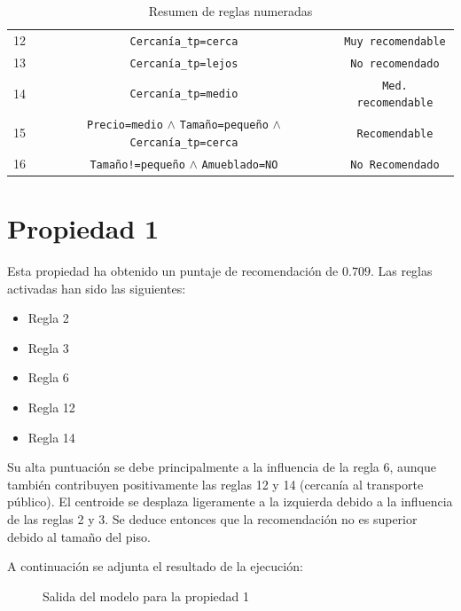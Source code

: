 \documentclass[12pt]{report} %
\begin{document}
\begin{table}[H]
\begin{tabular}{@{}ccc@{}}
        12 & \texttt{Cercanía\_tp=cerca}                                   & \texttt{Muy recomendable}\\
        13 & \texttt{Cercanía\_tp=lejos}                                   & \texttt{No recomendado}\\
        14 & \texttt{Cercanía\_tp=medio}                                   & \texttt{Med. recomendable}\\
        15 & \texttt{Precio=medio} $\land$ \texttt{Tamaño=pequeño} $\land$ \texttt{Cercanía\_tp=cerca}      & \texttt{Recomendable}\\
        16 & \texttt{Tamaño!=pequeño} $\land$ \texttt{Amueblado=NO}           & \texttt{No Recomendado}\\

        \bottomrule
    \end{tabular}
    \caption{Resumen de reglas numeradas}
    \end{table}

    \section{Propiedad 1}
    
    Esta propiedad ha obtenido un puntaje de recomendación de $0.709$. Las reglas activadas han sido las siguientes: 
    \begin{itemize}
        \item Regla 2
        \item Regla 3
        \item Regla 6
        \item Regla 12
        \item Regla 14
    \end{itemize}
    Su alta puntuación se debe principalmente a la influencia de la regla 6,
    aunque también contribuyen positivamente las reglas 12 y 14 (cercanía al
    transporte público). El centroide se desplaza ligeramente a la izquierda
    debido a la influencia de las reglas 2 y 3. Se deduce entonces que la
    recomendación no es superior debido al tamaño del piso.

    A continuación se adjunta el resultado de la ejecución:
    \begin{figure}[H]
        \centering
        \caption{Salida del modelo para la propiedad 1}
    \end{figure}
\end{document}
